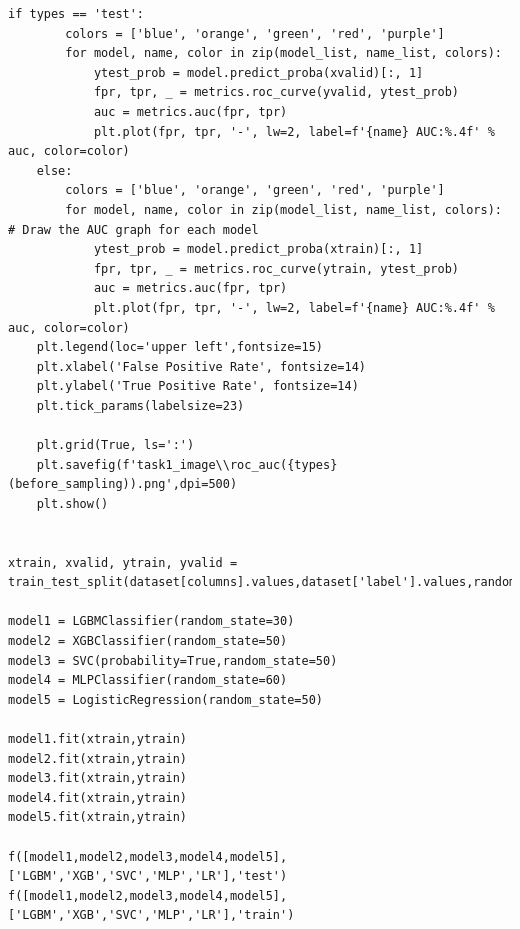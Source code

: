 \documentclass{article}
\begin{document}
\begin{lstlisting}[caption={Machine Learning Model: ccuracy, recall, precision, f1 and auc}, label=python-example]
    if types == 'test':
        colors = ['blue', 'orange', 'green', 'red', 'purple']
        for model, name, color in zip(model_list, name_list, colors):
            ytest_prob = model.predict_proba(xvalid)[:, 1]
            fpr, tpr, _ = metrics.roc_curve(yvalid, ytest_prob)
            auc = metrics.auc(fpr, tpr)
            plt.plot(fpr, tpr, '-', lw=2, label=f'{name} AUC:%.4f' % auc, color=color)
    else:
        colors = ['blue', 'orange', 'green', 'red', 'purple']
        for model, name, color in zip(model_list, name_list, colors): # Draw the AUC graph for each model
            ytest_prob = model.predict_proba(xtrain)[:, 1]
            fpr, tpr, _ = metrics.roc_curve(ytrain, ytest_prob)
            auc = metrics.auc(fpr, tpr)
            plt.plot(fpr, tpr, '-', lw=2, label=f'{name} AUC:%.4f' % auc, color=color)
    plt.legend(loc='upper left',fontsize=15)
    plt.xlabel('False Positive Rate', fontsize=14)
    plt.ylabel('True Positive Rate', fontsize=14)
    plt.tick_params(labelsize=23)

    plt.grid(True, ls=':')
    plt.savefig(f'task1_image\\roc_auc({types}(before_sampling)).png',dpi=500)
    plt.show()


xtrain, xvalid, ytrain, yvalid = train_test_split(dataset[columns].values,dataset['label'].values,random_state=620,test_size=0.2)

model1 = LGBMClassifier(random_state=30)
model2 = XGBClassifier(random_state=50)
model3 = SVC(probability=True,random_state=50)
model4 = MLPClassifier(random_state=60)
model5 = LogisticRegression(random_state=50)

model1.fit(xtrain,ytrain)
model2.fit(xtrain,ytrain)
model3.fit(xtrain,ytrain)
model4.fit(xtrain,ytrain)
model5.fit(xtrain,ytrain)

f([model1,model2,model3,model4,model5],['LGBM','XGB','SVC','MLP','LR'],'test')
f([model1,model2,model3,model4,model5],['LGBM','XGB','SVC','MLP','LR'],'train')
\end{lstlisting}
\end{document}
